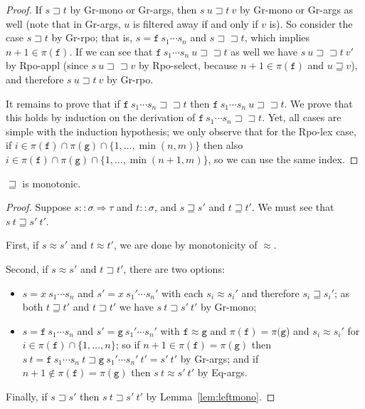 \documentclass[a4paper,USenglish,cleveref,autoref,thm-restate]{lipics-v2021}
\newcommand{\arrtype}{\Rightarrow}
\newcommand{\grmain}{\sqsupset}
\newcommand{\geqmain}{\sqsupseteq}
\newcommand{\ismain}{\approx}
\newcommand{\rpomain}{\sqsupset\!\!\sqsupset}
\newcommand{\symb}[1]{\mathtt{#1}}
\newcommand{\afun}{\symb{f}}
\newcommand{\bfun}{\symb{g}}
\newcommand{\atype}{\sigma}
\newcommand{\btype}{\tau}
\newcommand{\filter}{\pi}
\begin{document}
\begin{proof}
If $s \grmain t$ by Gr-mono or Gr-args, then $s\ u \grmain t\ v$ by Gr-mono or Gr-args as well
(note that in Gr-args, $u$ is filtered away if and only if $v$ is).  So consider the case
$s \grmain t$ by Gr-rpo; that is, $s =  \afun\ s_1 \cdots s_n$ and $s \rpomain t$, which implies
$n+1 \in \filter(\afun)$.  If we can see that $\afun\ s_1 \cdots s_n\ u \rpomain t$ as
well we have $s\ u \rpomain t\ v'$ by Rpo-appl (since $s\ u \rpomain v$ by Rpo-select, because
$n+1 \in \filter(\afun)$ and $u \geqmain v$), and therefore $s\ u \grmain t\ v$ by Gr-rpo.

It remains to prove that if $\afun\ s_1 \cdots s_n \rpomain t$ then $\afun\ s_1 \cdots s_n\ u
\rpomain t$.  We prove that this holds by induction on the derivation of $\afun\ s_1 \cdots s_n
\rpomain t$.  Yet, all cases are simple with the induction hypothesis; we only observe that for
the Rpo-lex case, if $i \in \filter(\afun) \cap \filter(\bfun) \cap \{1,\dots,\min(n,m)\}$ then
also $i \in \filter(\afun) \cap \filter(\bfun) \cap \{1,\dots,\min(n+1,m)\}$, so we can use the
same index.
\end{proof}

\begin{lemma}\label{lem:monotonic}
$\geqmain$ is monotonic.
\end{lemma}

\begin{proof}
Suppose $s :: \atype \arrtype \btype$ and $t :: \atype$, and $s \geqmain s'$ and $t \geqmain t'$.
We must see that $s\ t \geqmain s'\ t'$.

First, if $s \ismain s'$ and $t \ismain t'$, we are done by monotonicity of $\ismain$.

Second, if $s \ismain s'$ and $t \grmain t'$, there are two options:
\begin{itemize}
\item $s = x\ s_1 \cdots s_n$ and $s' = x\ s_1' \cdots s_n'$ with each $s_i \ismain s_i'$ and
  therefore $s_i \geqmain s_i'$; as both $t \geqmain t'$ and $t \grmain t'$ we have $s\ t \grmain
  s'\ t'$ by Gr-mono;
\item $s = \afun\ s_1 \cdots s_n$ and $s' = \bfun\ s_1' \cdots s_n'$ with $\afun \approx \bfun$ and
  $\filter(\afun) = \filter(\bfun$) and $s_i \ismain s_i'$ for $i \in \filter(\afun) \cap \{1,\dots,
  n\}$;
  so if $n+1 \in \filter(\afun) = \filter(\bfun)$ then $s\ t = \afun\ s_1 \cdots s_n\ t \grmain
  \bfun\ s_1' \cdots s_n'\ t' = s'\ t'$ by Gr-args;
  and if $n+1 \notin \filter(\afun) = \filter(\bfun)$ then $s\ t \ismain s'\ t'$ by Eq-args.
\end{itemize}

Finally, if $s \grmain s'$ then $s\ t \grmain s'\ t'$ by Lemma~\ref{lem:leftmono}.
\end{proof}
\end{document}
